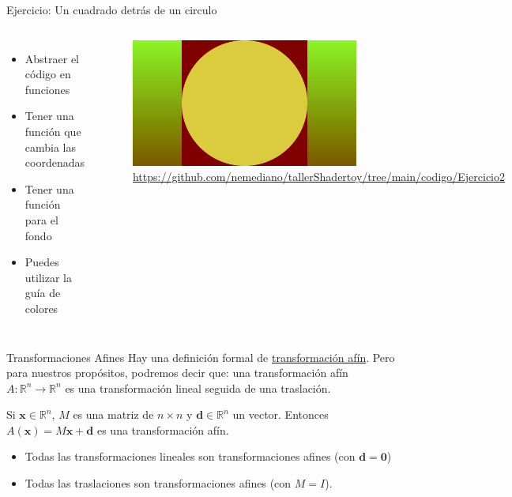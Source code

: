 \begin{frame}{Ejercicio: Un cuadrado detrás de un circulo}
\begin{columns}
     \begin{itemize}
         \item Abstraer el código en funciones
         \item Tener una función que cambia las coordenadas
         \item Tener una función para el fondo
         \item Puedes utilizar la guía de colores
     \end{itemize}
        \begin{figure}[htb]
            \centering
            \includegraphics[width=0.6\textwidth]{img/Ejer2}
            \caption{\url{https://github.com/nemediano/tallerShadertoy/tree/main/codigo/Ejercicio2}}
        \end{figure}
\end{columns}
\end{frame}

\begin{frame}{Transformaciones Afines}
Hay una definición formal de \href{https://en.wikipedia.org/wiki/Affine_transformation}{transformación afín}. Pero para nuestros propósitos, podremos decir que: una transformación afín $A: \mathbb{R}^n \rightarrow \mathbb{R}^n$ es una transformación lineal seguida de una traslación.

\begin{block}{}
    Si $\mathbf{x} \in \mathbb{R}^n$, $M$ es una matriz de $n \times n$ y $\mathbf{d} \in \mathbb{R}^n$ un vector.
    Entonces $A(\mathbf{x}) = M \mathbf{x} + \mathbf{d}$ es una transformación afín.
\end{block}
\begin{itemize}
    \item Todas las transformaciones lineales son transformaciones afines (con $\mathbf{d} = \mathbf{0}$)
    \item Todas las traslaciones son transformaciones afines (con $M = I$).
\end{itemize}
\end{frame}


